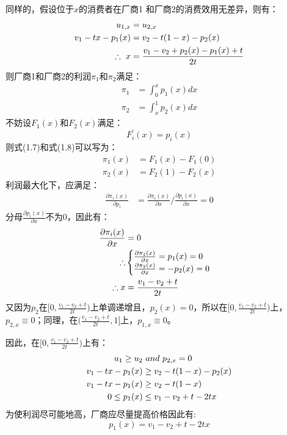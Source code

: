 同样的，假设位于$x$的消费者在厂商1 和厂商2的消费效用无差异，则有：
\begin{align}
     u_{1,x}&=u_{2,x} \notag \\ 
     v_1-tx-p_1(x) &= v_2-t(1-x)-p_2(x) \notag \\
     \therefore \  x &= \frac{v_1-v_2+p_2(x)-p_1(x)+t}{2t}
\end{align}
则厂商1和厂商2的利润$\pi_1$和$\pi_2$满足：
\begin{align}
    \pi_1 &=\int_0^x p_1(x)dx \\
    \pi_2 &= \int_x^1 p_2(x)dx 
\end{align}
不妨设$F_1(x)$和$F_2(x)$满足：
\begin{equation*}
    F_i^{'} (x) = p_i(x)
\end{equation*}
则式(1.7)和式(1.8)可以写为：
\begin{align}
    \pi_1(x) &=F_1(x)-F_1(0) \\
    \pi_2(x) &=F_2(1)-F_2(x)
\end{align}
利润最大化下，应满足：
\begin{align}
    \frac{\partial \pi_i(x) }{\partial p_i} &=\frac{\partial \pi_i(x)}{\partial x}\bigg/\frac{\partial p_i(x)}{\partial x}=0 
\end{align}
分母$\frac{\partial p_i(x)}{\partial x}$不为0，因此有：
\begin{align}
    \frac{\partial \pi_i(x)}{\partial x} &=0 \notag\\
    \therefore &\begin{cases}
      \frac{\partial \pi_1(x)}{\partial x} = p_1(x) =0 \\
      \frac{\partial \pi_2(x)}{\partial x} = -p_2(x) =0
\end{cases}  \notag \\
    \therefore x &= \frac{v_1-v_2+t}{2t} 
\end{align}
又因为$p_2$在$[0,\frac{v_1-v_2+t}{2t})$上单调递增且，$p_2(x)=0$，所以在$[0,\frac{v_1-v_2+t}{2t})$上，$p_{2,x}\equiv0$；同理，在$(\frac{v_1-v_2+t}{2t},1]$上，$p_{1,x}\equiv0$。

因此，在$[0,\frac{v_1-v_2+t}{2t})$上有：
\begin{align}
    u_1 \geq u_2 & \ and \ p_{2,x}=0 \notag \\
    v_1-tx-p_1(x) &\geq v_2-t(1-x)-p_2(x) \notag \\
    v_1-tx-p_1(x) &\geq v_2-t(1-x) \notag \\
   0\leq p_1(x) & \leq v_1-v_2+t-2tx 
\end{align}
为使利润尽可能地高，厂商应尽量提高价格因此有:
\begin{equation}
    p_1(x) = v_1-v_2+ t-2tx 
\end{equation}

